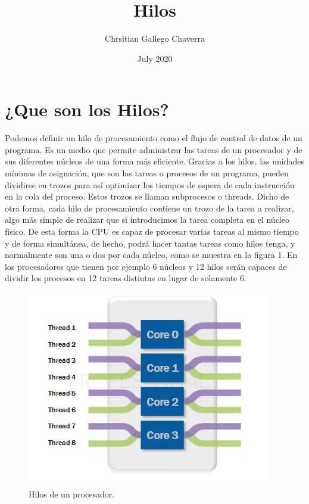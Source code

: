 \documentclass{article}
\title{Hilos}
\author{Chrsitian Gallego Chaverra}
\date{July 2020}
\begin{document}
\maketitle

\section{¿Que son los Hilos?}
Podemos definir un hilo de procesamiento como el flujo de control de datos de un programa. Es un medio que permite administrar las tareas de un procesador y de sus diferentes núcleos de una forma más eficiente. Gracias a los hilos, las unidades mínimas de asignación, que son las tareas o procesos de un programa, pueden dividirse en trozos para así optimizar los tiempos de espera de cada instrucción en la cola del proceso. Estos trozos se llaman subprocesos o threads.
Dicho de otra forma, cada hilo de procesamiento contiene un trozo de la tarea a realizar, algo más simple de realizar que si introducimos la tarea completa en el núcleo físico. De esta forma la CPU es capaz de procesar varias tareas al mismo tiempo y de forma simultánea, de hecho, podrá hacer tantas tareas como hilos tenga, y normalmente son una o dos por cada núcleo, como se muestra en la figura 1. En los procesadores que tienen por ejemplo 6 núcleos y 12 hilos serán capaces de dividir los procesos en 12 tareas distintas en lugar de solamente 6\cite{intro}.

\begin{figure}[h!]
\centering
\includegraphics[scale=0.7]{hilos.JPG}
\caption{Hilos de un procesador.\cite{intro}}
\label{fig:hilos}
\end{figure}
\end{document}
